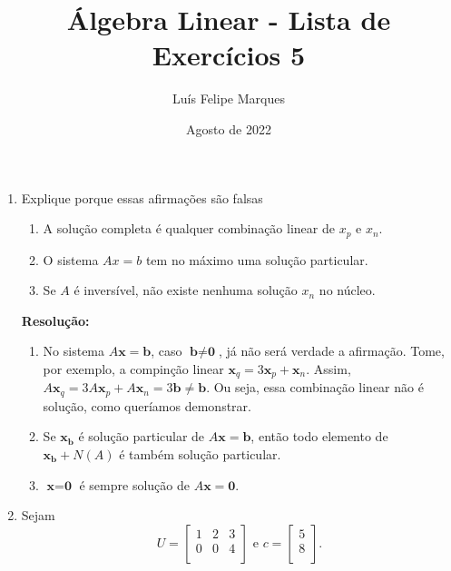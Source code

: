 \documentclass[leqno]{article}
\title{Álgebra Linear - Lista de Exercícios 5}
\author{Luís Felipe Marques}
\date{Agosto de 2022}
\begin{document}
 
\maketitle

\begin{enumerate}
    \item Explique porque essas afirmações são falsas
    
    \begin{enumerate}
        \item A solução completa é qualquer combinação linear de $x_p$ e $x_n$.
        
        \item O sistema $Ax=b$ tem no máximo uma solução particular.
        
        \item Se $A$ é inversível, não existe nenhuma solução $x_n$ no núcleo.
    \end{enumerate}
    
    \textbf{Resolução:}

    \begin{enumerate}
        \item No sistema $A\textbf{x}=\textbf{b}$, caso $\textbf{b}\neq\textbf{0}$, já não será verdade a afirmação. Tome, por exemplo, a compinção linear $\textbf{x}_q=3\textbf{x}_p+\textbf{x}_n$. Assim, $A\textbf{x}_q=3A\textbf{x}_p+A\textbf{x}_n=3\textbf{b}\neq\textbf{b}$. Ou seja, essa combinação linear não é solução, como queríamos demonstrar.
        
        \item Se $\textbf{x}_\textbf{b}$ é solução particular de $A\textbf{x} = \textbf{b}$, então todo elemento de $\textbf{x}_\textbf{b}+N(A)$ é também solução particular.
        
        \item $\textbf{x}=\textbf{0}$ é sempre solução de $A\textbf{x}=\textbf{0}$.
    \end{enumerate}
    
    \item Sejam
    $$U=\begin{bmatrix}
    1 & 2 & 3\\
    0 & 0 & 4\\
    \end{bmatrix}\text{ e }c=\begin{bmatrix}
    5\\
    8\\
    \end{bmatrix}\text{.}$$
    

\end{enumerate}
\end{document}
